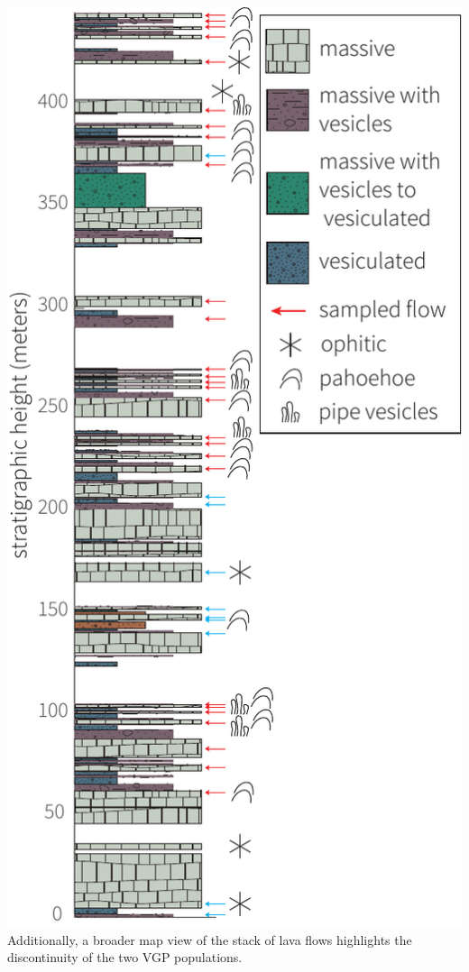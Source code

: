 \documentclass{article}
\begin{document}
\includegraphics{../data/SLB/plots/SLB_strat.pdf}\\

Additionally, a broader map view of the stack of lava flows highlights the discontinuity of the two VGP populations.\\
\end{document}
